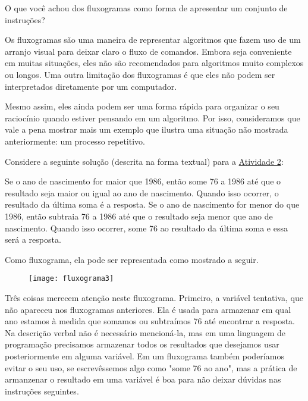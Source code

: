 \begin{reflection}
O que você achou dos fluxogramas como forma de apresentar um conjunto de instruções?
\end{reflection}

\label{comp-arr2}

Os fluxogramas são uma maneira de representar algoritmos que fazem uso de um arranjo visual para deixar claro o fluxo de comandos. Embora seja conveniente em muitas situações, eles não são recomendados para algoritmos muito complexos ou longos. Uma outra limitação dos fluxogramas é que eles não podem ser interpretados diretamente por um computador.

Mesmo assim, eles ainda podem ser uma forma rápida para organizar o seu raciocínio quando estiver pensando em um algoritmo. Por isso, consideramos que vale a pena mostrar mais um exemplo que ilustra uma situação não mostrada anteriormente: um processo repetitivo.

Considere a seguinte solução (descrita na forma textual) para a \hyperref[comp-task2]{Atividade 2}:

Se o ano de nascimento for maior que 1986, então some 76 a 1986 até que o resultado seja maior ou igual ao ano de nascimento. Quando isso ocorrer, o resultado da última soma é a resposta.
Se o ano de nascimento for menor do que 1986, então subtraia 76 a 1986 até que o resultado seja menor que ano de nascimento. Quando isso ocorrer, some 76 ao resultado da última soma e essa será a resposta.

Como fluxograma, ela pode ser representada como mostrado a seguir.

\begin{figure}[H]
\centering

\texttt{[image: fluxograma3]}
\end{figure}

Três coisas merecem atenção neste fluxograma.
Primeiro, a variável tentativa, que não apareceu nos fluxogramas anteriores. Ela é usada para armazenar em qual ano estamos à medida que somamos ou subtraímos 76 até encontrar a resposta. Na descrição verbal não é necessário mencioná-la, mas em uma linguagem de programação precisamos armazenar todos os resultados que desejamos usar posteriormente em alguma variável. Em um fluxograma também poderíamos evitar o seu uso, se escrevêssemos algo como "some 76 ao ano", mas a prática de armanzenar o resultado em uma variável é boa para não deixar dúvidas nas instruções seguintes.

